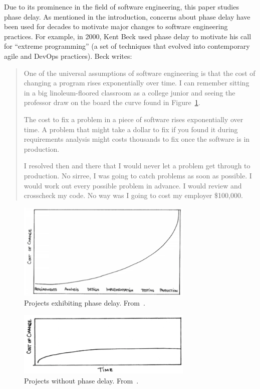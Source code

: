 \documentclass{sig-alternate}
\newcommand{\fig}[1]{Figure~\ref{fig:#1}}
\begin{document}
Due to its prominence in the field of software engineering,
this paper studies phase delay. As mentioned in the introduction, concerns about phase delay have
been used for decades to motivate major changes to software engineering practices. For example,
in 2000, Kent Beck used phase delay to motivate his call for ``extreme programming'' (a set of techniques
that evolved into contemporary agile and DevOps practices). Beck writes:
\begin{quote}
One of the universal assumptions of software engineering is that the cost of changing a program rises exponentially over time. I can remember sitting in a big linoleum-floored classroom as a college junior and seeing the professor draw on the board the curve found in \fig{curve1}.

The cost to fix a problem in a piece of software rises exponentially over time. A problem that might take a dollar to fix if you found it during requirements analysis might costs thousands to fix once the software is in production.

I resolved then and there that I would never let a problem get through to production. No sirree, I was going to catch problems as soon as possible. I would work out every possible problem in advance. I would review and crosscheck my code. No way was I going to cost my employer \$100,000.~\cite{beck00}
\end{quote}

\begin{figure}
 \includegraphics[width=3.3in]{beckB4.png}
 \caption{Projects exhibiting phase delay. From~\cite{beck00}.}\label{fig:curve1}
 \end{figure}
\begin{figure}
 \includegraphics[width=3.3in]{beckAFTER.png}
 \caption{Projects without   phase delay. From~\cite{beck00}.}\label{fig:curve2}
\end{figure}
\end{document}
